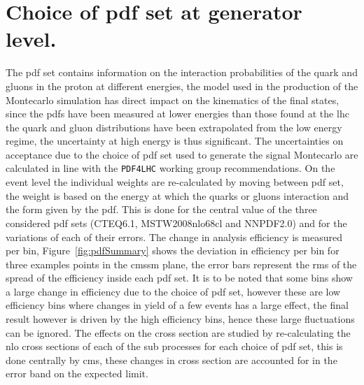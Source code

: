 \section{Choice of \ac{pdf} set at generator level.} %
\label{sub:choice_of_pdf_set_at_generator_level_}
The \ac{pdf} set contains information on the interaction probabilities of the 
quark and gluons in the proton at different energies, the model used in the 
production of the Montecarlo simulation has direct impact on the kinematics of 
the final states, since the \ac{pdf}s have been measured at lower energies than 
those found at the \ac{lhc} the quark and gluon distributions have been 
extrapolated from the low energy regime, the uncertainty at high energy is thus 
significant.
The uncertainties on acceptance due to the choice of \ac{pdf} set used to 
generate the signal Montecarlo are calculated in line with the 
\texttt{PDF4LHC}\cite{pdf4lhc} working group recommendations. On the event 
level the individual weights are re-calculated by moving between \ac{pdf} set, 
the weight is based on the energy at which the quarks or gluons interaction and 
the form given by the \ac{pdf}. This is done for the central value of the three 
considered \ac{pdf} sets (CTEQ6.1\cite{cteq6.1}, MSTW2008nlo68cl\cite{MSTW} and 
NNPDF2.0\cite{NNPDF}) and for the variations of each of their errors. The 
change in analysis efficiency is measured per \HT bin, 
Figure~\ref{fig:pdfSummary} shows the deviation in efficiency per bin for three 
examples points in the \ac{cmssm} plane, the error bars represent the \ac{rms} 
of the spread of the efficiency inside each \ac{pdf} set. It is to be noted 
that some bins show a large change in efficiency due to the choice of \ac{pdf} 
set, however these are low efficiency bins where changes in yield of a few 
events has a large effect, the final result however is driven by the high 
efficiency bins, hence these large fluctuations can be ignored. The effects on 
the cross section are studied by re-calculating the \ac{nlo} cross sections of 
each of the sub processes for each choice of \ac{pdf} set, this is done 
centrally by \ac{cms}, these changes in cross section are accounted for in the 
error band on the expected limit.

